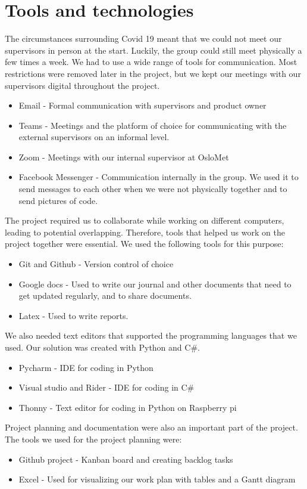 \section{Tools and technologies}
The circumstances surrounding Covid 19 meant that we could not meet our supervisors in person at the start. Luckily, the group could still meet physically a few times a week. We had to use a wide range of tools for communication. Most restrictions were removed later in the project, but we kept our meetings with our supervisors digital throughout the project. 

\begin{itemize}
	\item Email - Formal communication with supervisors and product owner
	\item Teams - Meetings and the platform of choice for communicating with the external supervisors on an informal level. 
	\item Zoom - Meetings with our internal supervisor at OsloMet
	\item Facebook Messenger - Communication internally in the group. We used it to send messages to each other when we were not physically together and to send pictures of code.
\end{itemize}

The project required us to collaborate while working on different computers, leading to potential overlapping. Therefore, tools that helped us work on the project together were essential. We used the following tools for this purpose:

\begin{itemize}
	\item Git and Github - Version control of choice
	\item Google docs - Used to write our journal and other documents that need to get updated regularly, and to share documents. 
	\item Latex - Used to write reports.
\end{itemize}

We also needed text editors that supported the programming languages that we used. Our solution was created with Python and C\#.
\begin{itemize}
	\item Pycharm - IDE for coding in Python
	\item Visual studio and Rider - IDE for coding in C\#
	\item Thonny - Text editor for coding in Python on Raspberry pi
\end{itemize}

Project planning and documentation were also an important part of the project. The tools we used for the project planning were:

\begin{itemize}
	\item Github project - Kanban board and creating backlog tasks
	\item Excel - Used for visualizing our work plan with tables and a Gantt diagram
\end{itemize}